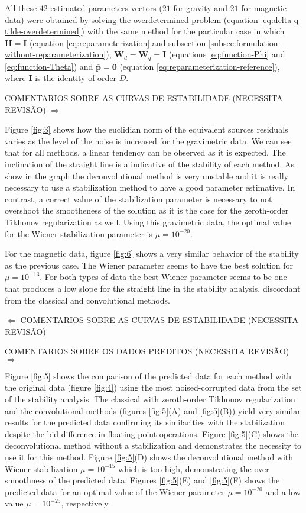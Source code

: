 All these $42$ estimated parameters vectors ($21$ for gravity and $21$ for magnetic data) were obtained by solving 
the overdetermined problem (equation \ref{eq:delta-q-tilde-overdetermined}) with the same method for the particular case in which
$\mathbf{H} = \mathbf{I}$ (equation \ref{eq:reparameterization} and 
subsection \ref{subsec:formulation-without-reparameterization}),
$\mathbf{W}_{d} = \mathbf{W}_{q} = \mathbf{I}$ (equations \ref{eq:function-Phi} and \ref{eq:function-Theta}) and
$\bar{\mathbf{p}} = \mathbf{0}$ (equation \ref{eq:reparameterization-reference}), where $\mathbf{I}$ is the identity of order $D$.

COMENTARIOS SOBRE AS CURVAS DE ESTABILIDADE (NECESSITA REVISÃO) $\Longrightarrow$
		
Figure \ref{fig:3} shows how the euclidian norm of the equivalent sources residuals varies as the level of the noise is increased for the gravimetric data. We can see that for all methods, a linear tendency can be observed as it is expected. The inclination of the straight line is a indicative of the stability of each method. As show in the graph the deconvolutional method is very unstable and it is really necessary to use a stabilization method to have a good parameter estimative. In contrast, a correct value of the stabilization parameter is necessary to not overshoot the smootheness of the solution as it is the case for the zeroth-order Tikhonov regularization as well. Using this gravimetric data, the optimal value for the Wiener stabilization parameter is $\mu = 10^{-20}$. 

For the magnetic data, figure \ref{fig:6} shows a very similar behavior of the stability as the previous case. The Wiener parameter seems to have the best solution for $\mu = 10^{-13}$. For both types of data the best Wiener parameter seems to be one that produces a low slope for the straight line in the stability analysis, discordant from the classical and convolutional methods. 

$\Longleftarrow$ COMENTARIOS SOBRE AS CURVAS DE ESTABILIDADE (NECESSITA REVISÃO)

COMENTARIOS SOBRE OS DADOS PREDITOS (NECESSITA REVISÃO) $\Longrightarrow$

Figure \ref{fig:5} shows the comparison of the predicted data for each method with the original data (figure \ref{fig:4}) using the most noised-corrupted data from the set of the stability analysis. The classical with zeroth-order Tikhonov regularization and the convolutional methods (figures \ref{fig:5}(A) and \ref{fig:5}(B)) yield very similar results for the predicted data confirming its similarities with the stabilization despite the bid difference in floating-point operations. Figure \ref{fig:5}(C) shows the deconvolutional method without a stabilization and demonstrates the necessity to use it for this method. Figure \ref{fig:5}(D) shows the deconvolutional method with Wiener stabilization $\mu = 10^{-15}$ which is too high, demonstrating the over smoothness of the predicted data. Figures \ref{fig:5}(E) and \ref{fig:5}(F) shows the predicted data for an optimal value of the Wiener parameter $\mu = 10^{-20}$ and a low value $\mu = 10^{-25}$, respectively.

